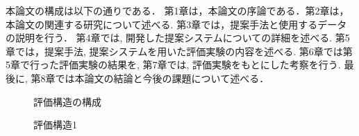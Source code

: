 \documentclass[syuuron]{kuee}
\begin{document}
	本論文の構成は以下の通りである．
	第1章は，本論文の序論である．第2章は，本論文の関連する研究について述べる. 第3章では，提案手法と使用するデータの説明を行う．
	第4章では, 開発した提案システムについての詳細を述べる. 
	第5章では，提案手法, 提案システムを用いた評価実験の内容を述べる. 
	第6章では第5章で行った評価実験の結果を, 第7章では, 評価実験をもとにした考察を行う. 
	最後に, 第8章では本論文の結論と今後の課題について述べる．

		\begin{figure}
			\begin{center}
			\end{center}
			\caption{評価構造の構成}
	  		\label{fig:es1}
		\end{figure}
		\begin{figure}
			\begin{center}
			\end{center}
			\caption{評価構造1}
	  		\label{fig:es2}
		\end{figure}
\end{document}
